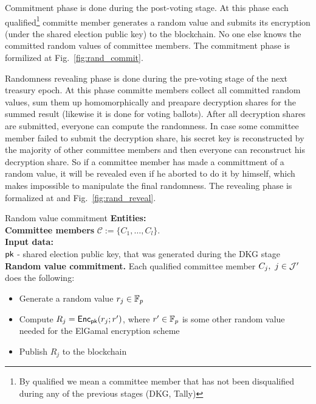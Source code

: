Commitment phase is done during the post-voting stage. At this phase each qualified\footnote{By qualified we mean a committee member that has not been disqualified during any of the previous stages (DKG, Tally)} committe member generates a random value and submits its encryption (under the shared election public key) to the blockchain. No one else knows the committed random values of committee members. The commitment phase is formilized at Fig.~\ref{fig:rand_commit}.

Randomness revealing phase is done during the pre-voting stage of the next treasury epoch. At this phase committe members collect all committed random values, sum them up homomorphically and preapare decryption shares for the summed result (likewise it is done for voting ballots). After all decryption shares are submitted, everyone can compute the randomness. In case some committee member failed to submit the decryption share, his secret key is reconstructed by the majority of other committee members and then everyone can reconstruct his decryption share. So if a committee member has made a committment of a random value, it will be revealed even if he aborted to do it by himself, which makes impossible to manipulate the final randomness. The revealing phase is formalized at  and Fig.~\ref{fig:rand_reveal}.

\begin{boxfig}{\label{fig:rand_commit}Random value commitment}{}
\footnotesize
\textbf{Entities:}\\
    \hspace*{6mm} \textbf{Committee members} $\mathcal{C}:=\{C_1,\ldots, C_l \}$.\\

\textbf{Input data:}\\
    \hspace*{6mm} $\mathsf{pk}$ - shared election public key, that was generated during the DKG stage\\

\textbf{Random value commitment.}
Each qualified committee member $C_j,~j\in\mathcal{J}'$ does the following:
\begin{itemize}
	\item Generate a random value $r_j\in\mathbb{F}_p$
	\item Compute $R_j=\mathsf{Enc}_{\mathsf{pk}}(r_j;r')$, where $r'\in\mathbb{F}_p$ is some other random value needed for the ElGamal encryption scheme
    \item Publish $R_j$ to the blockchain
\end{itemize}
\end{boxfig}


